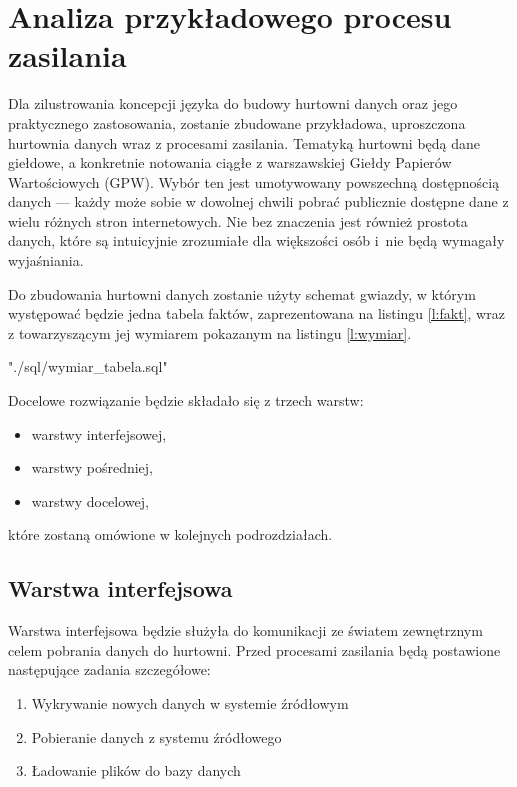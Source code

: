 \section{Analiza przykładowego procesu zasilania} \label{p_r_analiza_procesu}
Dla zilustrowania koncepcji języka do budowy hurtowni danych oraz jego praktycznego zastosowania,
 zostanie zbudowane przykładowa,
 uproszczona hurtownia danych wraz z procesami zasilania. 
Tematyką hurtowni będą dane giełdowe,
 a konkretnie notowania ciągłe z warszawskiej Giełdy Papierów Wartościowych (GPW).
Wybór ten jest umotywowany powszechną dostępnością danych ---
 każdy może sobie w dowolnej chwili pobrać publicznie dostępne dane z wielu różnych stron internetowych.
Nie bez znaczenia jest również prostota danych, które są intuicyjnie zrozumiałe dla większości osób 
 i~nie będą wymagały wyjaśniania.

Do zbudowania hurtowni danych zostanie użyty schemat gwiazdy, 
 w którym występować będzie jedna tabela faktów, zaprezentowana na listingu \ref{l:fakt},
 wraz z towarzyszącym jej wymiarem pokazanym na listingu \ref{l:wymiar}.
 
 {"./sql/wymiar_tabela.sql"} 

 
Docelowe rozwiązanie będzie składało się z trzech warstw:
 \begin{itemize}
  \item warstwy interfejsowej,
  \item warstwy pośredniej,
  \item warstwy docelowej,
 \end{itemize}
które zostaną omówione w kolejnych podrozdziałach.

\subsection{Warstwa interfejsowa}

Warstwa interfejsowa będzie służyła do komunikacji ze światem zewnętrznym celem pobrania danych do hurtowni. 
Przed procesami zasilania będą postawione następujące zadania szczegółowe:
\begin{enumerate}
 \item \label{w_intf:wykrywanie}
 Wykrywanie nowych danych w systemie źródłowym
 \item \label{w_inf:pobieranie}
 Pobieranie danych z systemu źródłowego
 \item \label{w_intf_ladowanie}
Ładowanie plików do bazy danych                 
        
\end{enumerate}

